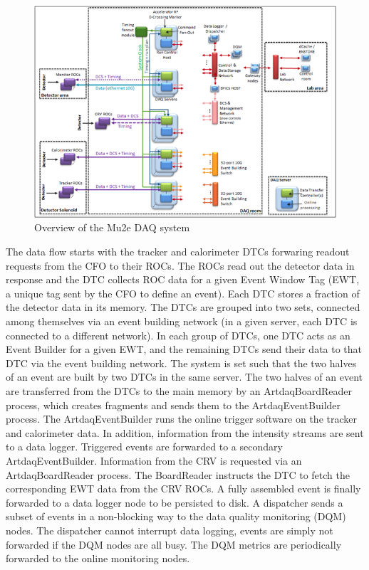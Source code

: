 \begin{figure}[htb]
\begin{center}
\includegraphics[width=0.9\linewidth]{figures/daq-overview.png}
\caption{Overview of the Mu2e DAQ system}
\label{fig:daqoverview}
\end{center}
\end{figure}

The data flow starts with the tracker and calorimeter DTCs forwaring readout requests from the CFO to their ROCs. The ROCs read out the detector data in response and the DTC collects ROC data for a given Event Window Tag (EWT, a unique tag sent by the CFO to define an event). Each DTC stores a fraction of the detector data in its memory. The DTCs are grouped into two sets, connected among themselves via an event building network (in a given server, each DTC is connected to a different network). In each group of DTCs, one DTC acts as an Event Builder for a given EWT, and the remaining DTCs send their data to that DTC via the event building network. The system is set such that the two halves of an event are built by two DTCs in the same server. The two halves of an event are transferred from the DTCs to the main memory by an ArtdaqBoardReader process, which creates fragments and sends them to the ArtdaqEventBuilder process. The ArtdaqEventBuilder runs the online trigger software on the tracker and calorimeter data. In addition, information from the intensity streams are sent to a data logger. Triggered events are forwarded to a secondary ArtdaqEventBuilder. Information from the CRV is requested via an ArtdaqBoardReader process. The BoardReader instructs the DTC to fetch the corresponding EWT data from the CRV ROCs. A fully assembled event is finally forwarded to a data logger node to be persisted to disk. A dispatcher sends a subset of events in a non-blocking way to the data quality monitoring (DQM) nodes. The dispatcher cannot interrupt data logging, events are simply not forwarded if the DQM nodes are all busy. The DQM metrics are periodically forwarded to the online monitoring nodes.

